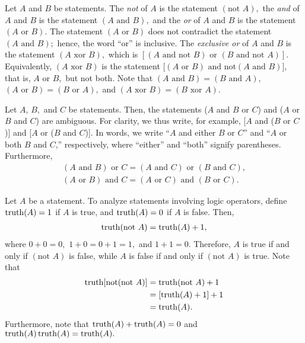 Let $A$ and $B$ be statements.  %
%
%
The {\it not} of $A$ is the
statement $(\mbox{not } A),$ the {\it and} of $A$ and $B$ is the
statement
%
%
%
%
%
%
%
%
$(A\mbox{ and } B),$ and the {\it or} of $A$ and $B$ is the
statement $(A\mbox{ or } B).$
The statement $(A\mbox{ or } B)$ does
not contradict the statement $(A\mbox{ and } B);$ hence, the word ``or'' is
inclusive.
The {\it exclusive or} of $A$ and $B$ is the statement $(A\mbox{ xor } B),$
which is $[(A\mbox{ and not } B) \mbox{ or }(B\mbox{ and not } A)].$
%
Equivalently, $(A\mbox{ xor } B)$ is the statement [$(A\mbox{ or } B)\mbox{ and not}(A\mbox{ and }B)]$, that is, $A$ or $B,$ but not both.
%
Note that $(A\mbox{ and } B)= (B\mbox{ and } A),$  $(A\mbox{ or } B)= (B\mbox{ or } A),$ and $(A\mbox{ xor } B)= (B\mbox{ xor } A).$


Let $A$, $B,$ and $C$ be statements.  Then, the statements ($A$ and $B$ or $C$) and ($A$ or $B$ and $C$) are
ambiguous. For clarity, we thus write, for example, [$A$ and ($B$ or $C$)] and [$A$ or ($B$ and $C$)].  In words, we write
``$A$ and either $B$ or $C$'' and ``$A$ or both $B$ and $C$,'' respectively, where ``either'' and ``both'' signify parentheses.
%
Furthermore,
%
%
%
\begin{gather}
%
(A\mbox{ and } B) \mbox{ or } C = (A\mbox{ and } C)\mbox{ or }(B\mbox{ and }C),\\
%
(A\mbox{ or } B) \mbox{ and } C = (A\mbox{ or } C)\mbox{ and }(B\mbox{ or }C).
%
\end{gather}










Let $A$ be a statement.  To analyze statements involving logic operators, define $\operatorname{truth}(A) = 1$ if $A$ is true, and $\operatorname{truth}(A) = 0$ if $A$ is false.  Then,
%
%
\begin{align}
%
\truth(\mbox{not }A) = \truth(A)+1,
%
\end{align}
%
where $0+0=0,$ $1+0 = 0+1 = 1,$ and $1+1=0.$
%
Therefore, $A$ is true if and only if $(\mbox{not }A)$ is false, while $A$ is false if and only if $(\mbox{not }A)$ is true.
%
Note that
%
%
\begin{align*}
%
\truth[\mbox{not}(\mbox{not }A)] &= \truth(\mbox{not }A)+1\\
%
&= [\truth(A)+1]+1\\
%
&= \truth(A).
%
\end{align*}
%
Furthermore, note that $\operatorname{truth}(A)+\operatorname{truth}(A)=0$ and $\operatorname{truth}(A)\operatorname{truth}(A)=\operatorname{truth}(A).$




